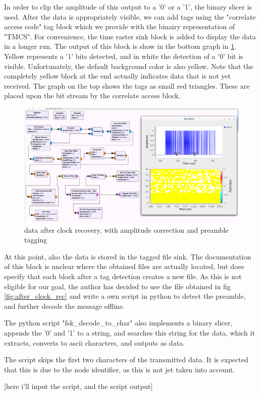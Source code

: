 In order to clip the amplitude of this output to a '0' or a '1', the binary slicer is used. After the data is appropriately visible, we can add tags using the "correlate access code" tag block which we provide with the binairy representation of "TMCS". For convenience, the time raster sink block is added to display the data in a longer run. The output of this block is show in the bottom graph in \ref{fig:taggedburst}. Yellow represents a '1' bits detected, and in white the detection of a '0' bit is visible. Unfortunately, the default background color is also yellow. Note that the completely yellow block at the end actually indicates data that is not yet received. The graph on the top shows the tags as small red triangles. These are placed upon the bit stream by the correlate access block. 

\begin{figure}[h]
\centering
\includegraphics[width=1\linewidth]{"figures/tagged burst"}
\caption[tagged burst]{data after clock recovery, with amplitude correction and preamble tagging}
\label{fig:taggedburst}
\end{figure}


At this point, also the data is stored in the tagged file sink. The documentation of this block is unclear where the obtained files are actually located, but does specify that each block after a tag detection creates a new file. As this is not eligible for our goal, the author has decided to use the file obtained in fig \ref{fig:after_clock_rec} and write a own script in python to detect the preamble, and further decode the message offline. 

The python script "fsk\_decode\_to\_char" also implements a binary slicer, appends the '0' and '1' to a string, and searches this string for the data, which it extracts, converts to ascii characters, and outputs as data. 

The script skips the first two characters of the transmitted data. It is expected that this is due to the node identifier, as this is not jet taken into account.

[here i'll input the script, and the script output]

